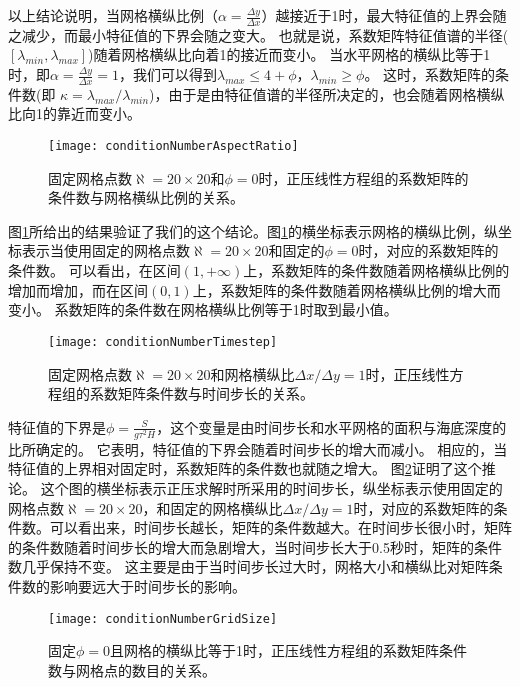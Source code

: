 以上结论说明，当网格横纵比例（$\alpha  = \frac{ \Delta y}{ \Delta x }$）越接近于1时，最大特征值的上界会随之减少，而最小特征值的下界会随之变大。
也就是说，系数矩阵特征值谱的半径($[\lambda_{min}, \lambda_{max}]$)随着网格横纵比向着1的接近而变小。 
当水平网格的横纵比等于1时，即$ \alpha = \frac{ \Delta y}{ \Delta x} = 1$，我们可以得到$\lambda_{max} \le  4 +\phi$，$\lambda_{min} \ge   \phi$。
这时，系数矩阵的条件数(即 $\kappa=  \lambda_{max}/\lambda_{min}$)，由于是由特征值谱的半径所决定的，也会随着网格横纵比向1的靠近而变小。 

\begin{figure}[ht]
\centering
\texttt{[image: conditionNumberAspectRatio]}
\caption[] {固定网格点数$\aleph = 20\times 20$和$\phi = 0$时，正压线性方程组的系数矩阵的条件数与网格横纵比例的关系。 \label{fig:conditionNumberRatio}}
\end{figure}
图\ref{fig:conditionNumberRatio}所给出的结果验证了我们的这个结论。图\ref{fig:conditionNumberRatio}的横坐标表示网格的横纵比例，纵坐标表示当使用固定的网格点数$\aleph = 20\times 20$和固定的$\phi = 0$时，对应的系数矩阵的条件数。 
可以看出，在区间$(1, +\infty)$上，系数矩阵的条件数随着网格横纵比例的增加而增加，而在区间$(0,1)$上，系数矩阵的条件数随着网格横纵比例的增大而变小。
系数矩阵的条件数在网格横纵比例等于1时取到最小值。
 
\begin{figure}[ht]
\centering
\texttt{[image: conditionNumberTimestep]}
\caption[] {固定网格点数$\aleph= 20\times 20$和网格横纵比$\Delta x /{\Delta y} = 1$时，正压线性方程组的系数矩阵条件数与时间步长的关系。 \label{fig:conditionNumberDt}}
\end{figure}
特征值的下界是$\phi=\frac{S }{g \tau^2 H}$，这个变量是由时间步长和水平网格的面积与海底深度的比所确定的。
它表明，特征值的下界会随着时间步长的增大而减小。 
相应的，当特征值的上界相对固定时，系数矩阵的条件数也就随之增大。
图\ref{fig:conditionNumberDt}证明了这个推论。
这个图的横坐标表示正压求解时所采用的时间步长，纵坐标表示使用固定的网格点数$\aleph= 20\times 20$，和固定的网格横纵比$\Delta x /{\Delta y} = 1$时，对应的系数矩阵的条件数。可以看出来，时间步长越长，矩阵的条件数越大。在时间步长很小时，矩阵的条件数随着时间步长的增大而急剧增大，当时间步长大于0.5秒时，矩阵的条件数几乎保持不变。
这主要是由于当时间步长过大时，网格大小和横纵比对矩阵条件数的影响要远大于时间步长的影响。

\begin{figure}[ht]
\centering
\texttt{[image: conditionNumberGridSize]}
\caption[] {固定$\phi=0$且网格的横纵比等于1时，正压线性方程组的系数矩阵条件数与网格点的数目的关系。 \label{fig:conditionNumbGrid}}
\end{figure}
 
